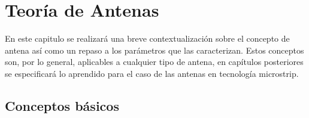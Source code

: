 
\chapter{Teoría de Antenas}
\par En este capitulo se realizará una breve contextualización sobre el concepto de antena así como un repaso a los parámetros que las caracterizan. Estos conceptos son, por lo general, aplicables a cualquier tipo de antena, en capítulos posteriores se especificará lo aprendido para el caso de las antenas en tecnología microstrip.

\section{Conceptos básicos}

